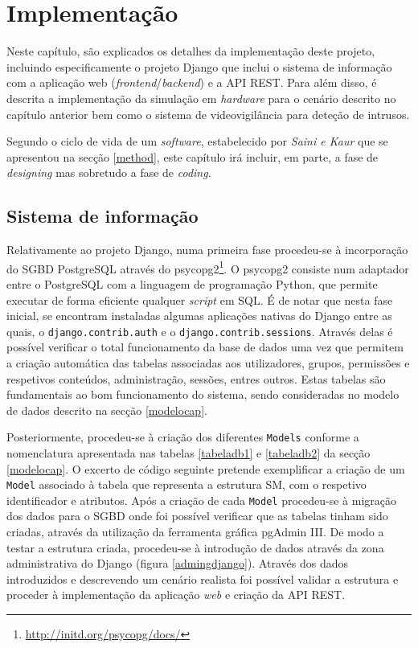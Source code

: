 
\chapter{Implementação}
\label{implementacao}

Neste capítulo, são explicados os detalhes da implementação deste projeto, incluindo especificamente o projeto Django que inclui o sistema de informação com a aplicação web (\textit{frontend}/\textit{backend}) e a API REST. Para além disso, é descrita a implementação da simulação em \textit{hardware} para o cenário descrito no capítulo anterior bem como o sistema de videovigilância para deteção de intrusos. 

Segundo o ciclo de vida de um \textit{software}, estabelecido por \textit{Saini e Kaur}\cite{Saini2014} que se apresentou na secção \ref{method}, este capítulo irá incluir, em parte, a fase de \textit{designing} mas sobretudo a fase de \textit{coding}. 

\section{Sistema de informação}

Relativamente ao projeto Django, numa primeira fase procedeu-se à incorporação do \ac{SGBD} PostgreSQL através do psycopg2\footnote{\url{http://initd.org/psycopg/docs/}}. O psycopg2 consiste num adaptador entre o PostgreSQL com a linguagem de programação Python, que permite executar de forma eficiente qualquer \textit{script} em \ac{SQL}. É de notar que nesta fase inicial, se encontram instaladas algumas aplicações nativas do Django entre as quais, o  \texttt{django.contrib.auth} e  o \texttt{django.contrib.sessions}. Através delas é possível verificar o total funcionamento da base de dados uma vez que permitem a criação automática das tabelas associadas aos utilizadores, grupos, permissões e respetivos conteúdos, administração, sessões, entres outros. Estas tabelas são fundamentais ao bom funcionamento do sistema, sendo consideradas no modelo de dados descrito na secção \ref{modelocap}. 

Posteriormente, procedeu-se à criação dos diferentes \texttt{Models} conforme a nomenclatura apresentada nas tabelas \ref{tabeladb1} e \ref{tabeladb2} da secção \ref{modelocap}. O excerto de código seguinte pretende exemplificar a criação de um \texttt{Model} associado à tabela que representa a estrutura \acl{SM}, com o respetivo identificador e atributos.  Após a criação de cada \texttt{Model} procedeu-se à migração dos dados para o \ac{SGBD} onde foi possível verificar que as tabelas tinham sido criadas, através da utilização da ferramenta gráfica pgAdmin III. De modo a testar a estrutura criada, procedeu-se à introdução de dados através da zona administrativa do Django (figura \ref{admingdjango}). Através dos dados introduzidos e descrevendo um cenário realista foi possível validar a estrutura e proceder à implementação da aplicação \textit{web} e criação da \ac{API} \ac{REST}. 

